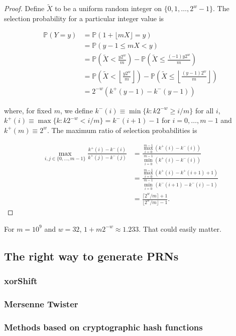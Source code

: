 \documentclass[12pt]{article}
\newcommand{\todo}[1]{{\color{red}{TO DO: \sc #1}}}
\newcommand{\pr}{\mathbb{P}} %
\begin{document}
\begin{proof}
Define $\tilde{X}$ to be a uniform random integer on $\{0, 1, \dots, 2^w - 1\}$.
The selection probability for a particular integer value is 

\begin{align*}
\pr\left(Y = y\right) &= \pr\left(1 + \lfloor mX \rfloor = y\right) \\
&= \pr\left(y-1 \leq mX < y\right) \\
&= \pr\left(\tilde{X} < \frac{y2^w}{m}\right) - \pr\left(\tilde{X} \leq \frac{(-1)y2^w}{m}\right)\\
&= \pr\left(\tilde{X} < \left\lfloor\frac{y2^w}{m}\right\rfloor\right) - \pr\left(\tilde{X} \leq \left\lfloor\frac{(y-1)2^w}{m}\right\rfloor\right)\\
&= 2^{-w}\left(k^+(y-1)- k^-(y-1)\right)
\end{align*}

\noindent where, for fixed $m$, we define $k^-(i) \equiv \min \{k: k2^{-w} \geq i/m\}$ for all $i$,
$k^+(i) \equiv \max \{k : k2^{-w} < i/m \} = k^-(i+1)-1$ for $i = 0, \dots, m-1$
and $k^+(m) \equiv 2^w$.
The maximum ratio of selection probabilities is 

\begin{align*}
\max_{i, j \in \{0, \ldots, m-1\}} \frac{k^+(i) - k^-(i)}{k^+(j) - k^-(j)}
&= \frac{ \max_{i=0}^{m-1} (k^+(i) - k^-(i))}{\min_{i=0}^{m-1} (k^+(i) - k^-(i))} \\
&= \frac{ \max_{i=0}^{m-1} (k^+(i) - k^+(i+1) + 1)}{\min_{i=0}^{m-1} (k^-(i+1) - k^-(i) - 1)} \\
&= \frac{\lceil 2^w/m \rceil + 1}{\lfloor 2^w/m \rfloor -1}.
\end{align*}
\end{proof}
\todo{is this proof right? seems wrong}

For $m = 10^9$ and $w=32$, $1 + m 2^{-w} \approx 1.233$. That could easily matter.

\subsection{The right way to generate PRNs}
\subsubsection{xorShift}
\subsubsection{Mersenne Twister}
\subsubsection{Methods based on cryptographic hash functions}
\end{document}

